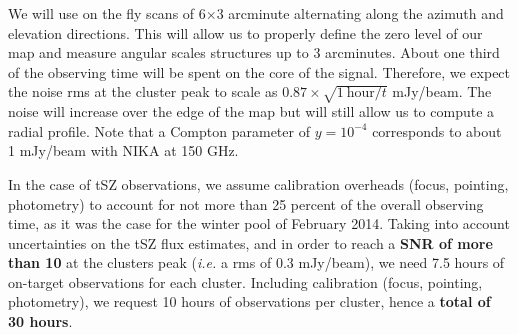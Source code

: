 \documentclass[11pt,a4paper,twoside,graphicx,color]{article}
\begin{document}
{We will use on the fly scans of 6$\times$3 arcminute alternating along the azimuth and elevation directions. This will allow us to properly define the zero level of our map and measure angular scales structures up to 3 arcminutes. About one third of the observing time will be spent on the core of the signal. Therefore, we expect the noise rms at the cluster peak to scale as $0.87 \times \sqrt{\mathrm{1 \ hour}/t}$ mJy/beam. The noise will increase over the edge of the map but will still allow us to compute a radial profile. Note that a Compton parameter of $y = 10^{-4}$ corresponds to about 1 mJy/beam with NIKA at 150 GHz.

In the case of tSZ observations, we assume calibration overheads (focus, pointing, photometry) to account for not more than 25 percent of the overall observing time, as it was the case for the winter pool of February 2014. Taking into account uncertainties on the tSZ flux estimates, and in order to reach a {\bf SNR of more than 10} at the clusters peak ({\it i.e.} a rms of 0.3 mJy/beam), we need 7.5 hours of on-target observations for each cluster. Including calibration (focus, pointing, photometry), we request 10 hours of observations per cluster, hence a {\bf total of 30 hours}.

}
\end{document}
